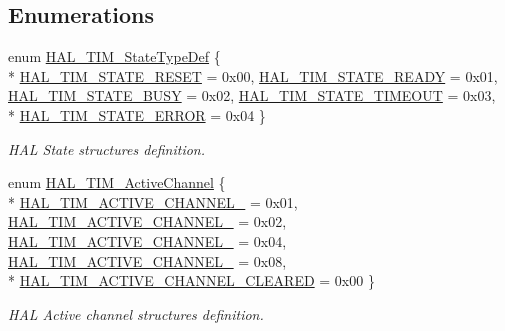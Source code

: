 \subsection*{Enumerations}
\begin{DoxyCompactItemize}
\item 
enum \hyperlink{group___t_i_m___exported___types_gae0994cf5970e56ca4903e9151f40010c}{H\-A\-L\-\_\-\-T\-I\-M\-\_\-\-State\-Type\-Def} \{ \\*
\hyperlink{group___t_i_m___exported___types_ggae0994cf5970e56ca4903e9151f40010ca28011b79e60b74a6c55947c505c51cbc}{H\-A\-L\-\_\-\-T\-I\-M\-\_\-\-S\-T\-A\-T\-E\-\_\-\-R\-E\-S\-E\-T} = 0x00, 
\hyperlink{group___t_i_m___exported___types_ggae0994cf5970e56ca4903e9151f40010ca4545554d7fa04d17e78d69d17cb7e4b3}{H\-A\-L\-\_\-\-T\-I\-M\-\_\-\-S\-T\-A\-T\-E\-\_\-\-R\-E\-A\-D\-Y} = 0x01, 
\hyperlink{group___t_i_m___exported___types_ggae0994cf5970e56ca4903e9151f40010ca1ddbfef19ad0562eb8143919b710cc12}{H\-A\-L\-\_\-\-T\-I\-M\-\_\-\-S\-T\-A\-T\-E\-\_\-\-B\-U\-S\-Y} = 0x02, 
\hyperlink{group___t_i_m___exported___types_ggae0994cf5970e56ca4903e9151f40010ca03e3339df71a74ac37820f72c2989371}{H\-A\-L\-\_\-\-T\-I\-M\-\_\-\-S\-T\-A\-T\-E\-\_\-\-T\-I\-M\-E\-O\-U\-T} = 0x03, 
\\*
\hyperlink{group___t_i_m___exported___types_ggae0994cf5970e56ca4903e9151f40010ca318cceb243cb9ca9e01833913e4f90ea}{H\-A\-L\-\_\-\-T\-I\-M\-\_\-\-S\-T\-A\-T\-E\-\_\-\-E\-R\-R\-O\-R} = 0x04
 \}
\begin{DoxyCompactList}\small\item\em H\-A\-L State structures definition. \end{DoxyCompactList}\item 
enum \hyperlink{group___t_i_m___exported___types_gaa3fa7bcbb4707f1151ccfc90a8cf9706}{H\-A\-L\-\_\-\-T\-I\-M\-\_\-\-Active\-Channel} \{ \\*
\hyperlink{group___t_i_m___exported___types_ggaa3fa7bcbb4707f1151ccfc90a8cf9706a2024e95c48b58ec9b2115faa276e3fad}{H\-A\-L\-\_\-\-T\-I\-M\-\_\-\-A\-C\-T\-I\-V\-E\-\_\-\-C\-H\-A\-N\-N\-E\-L\-\_} = 0x01, 
\hyperlink{group___t_i_m___exported___types_ggaa3fa7bcbb4707f1151ccfc90a8cf9706ae80e6a1dd1c479f504219c0fec2f3322}{H\-A\-L\-\_\-\-T\-I\-M\-\_\-\-A\-C\-T\-I\-V\-E\-\_\-\-C\-H\-A\-N\-N\-E\-L\-\_} = 0x02, 
\hyperlink{group___t_i_m___exported___types_ggaa3fa7bcbb4707f1151ccfc90a8cf9706acc3fcf4ee6d91744c4bc6a5eccde2601}{H\-A\-L\-\_\-\-T\-I\-M\-\_\-\-A\-C\-T\-I\-V\-E\-\_\-\-C\-H\-A\-N\-N\-E\-L\-\_} = 0x04, 
\hyperlink{group___t_i_m___exported___types_ggaa3fa7bcbb4707f1151ccfc90a8cf9706a7d98ec7e385cacb3aaa6cec601fa6ab6}{H\-A\-L\-\_\-\-T\-I\-M\-\_\-\-A\-C\-T\-I\-V\-E\-\_\-\-C\-H\-A\-N\-N\-E\-L\-\_} = 0x08, 
\\*
\hyperlink{group___t_i_m___exported___types_ggaa3fa7bcbb4707f1151ccfc90a8cf9706a574f72ac3bb41fe660318aa42dfdc98d}{H\-A\-L\-\_\-\-T\-I\-M\-\_\-\-A\-C\-T\-I\-V\-E\-\_\-\-C\-H\-A\-N\-N\-E\-L\-\_\-\-C\-L\-E\-A\-R\-E\-D} = 0x00
 \}
\begin{DoxyCompactList}\small\item\em H\-A\-L Active channel structures definition. \end{DoxyCompactList}\end{DoxyCompactItemize}


